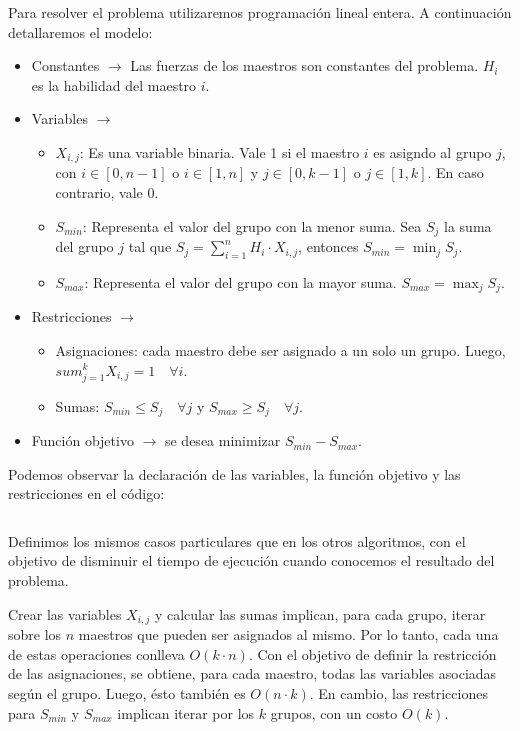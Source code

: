 \documentclass{article}
\begin{document}
Para resolver el problema utilizaremos programación lineal entera. A continuación detallaremos el modelo:
\begin{itemize}
    \item Constantes $\rightarrow$ Las fuerzas de los maestros son constantes del problema. $H_i$ es la habilidad del maestro $i$.
    \item Variables $\rightarrow$
    \begin{itemize}
        \item $X_{i,j}$: Es una variable binaria. Vale 1 si el maestro $i$ es asigndo al grupo $j$, con $i \in [0, n-1]$ o $i \in [1, n]$ y $ j \in [0, k-1]$ o $j \in [1, k]$. En caso contrario, vale 0.
        \item $S_{min}$: Representa el valor del grupo con la menor suma. Sea $S_j$ la suma del grupo $j$ tal que $S_j = \sum_{i=1}^{n} H_i \cdot X_{i,j} $, entonces $S_{min} = \min_j S_j$. 
        \item $S_{max}$: Representa el valor del grupo con la mayor suma. $S_{max} = \max_j S_j$.
    \end{itemize}
    \item Restricciones $\rightarrow$
    \begin{itemize}
        \item Asignaciones: cada maestro debe ser asignado a un solo un grupo. Luego, $sum_{j=1}^{k} X_{i,j} = 1 \quad \forall i$.
        \item Sumas: $S_{min} \leq S_j \quad \forall j$ y $S_{max} \geq S_j \quad \forall j$.
    \end{itemize}
    \item Función objetivo $\rightarrow$ se desea minimizar $S_{min} - S_{max}$.
\end{itemize}

Podemos observar la declaración de las variables, la función objetivo y las restricciones en el código:

\inputminted[linenos, firstline=4]{python}{codigo/programacion_lineal.py}

Definimos los mismos casos particulares que en los otros algoritmos, con el objetivo de disminuir el tiempo de ejecución cuando conocemos el resultado del problema.

Crear las variables $X_{i,j}$ y calcular las sumas implican, para cada grupo, iterar sobre los $n$ maestros que pueden ser asignados al mismo. Por lo tanto, cada una de estas operaciones conlleva $O(k \cdot n)$. Con el objetivo de definir la restricción de las asignaciones, se obtiene, para cada maestro, todas las variables asociadas según el grupo. Luego, ésto también es $O(n \cdot k)$. En cambio, las restricciones para $S_{min}$ y $S_{max}$ implican iterar por los $k$ grupos, con un costo $O(k)$. 
\end{document}
